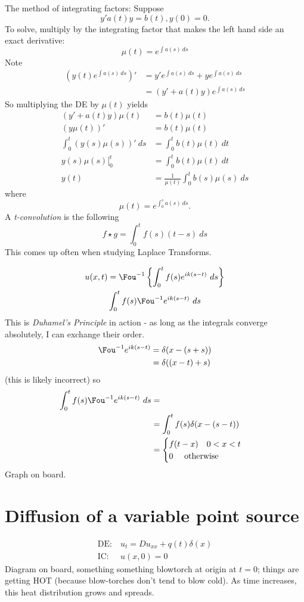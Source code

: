 \documentclass[cm]{article}
\begin{document}
\xex
\rec
The method of integrating factors: Suppose
$$y' a(t)y = b(t), y(0) = 0.$$
To solve, multiply by the integrating factor that makes the left hand side an
exact derivative:
$$\mu(t) = e^{\int a(s)~ds}$$
Note
\begin{align*}
    (y(t) e^{\int a(s)~ds})' &= y' e^{\int a(s) ~ds} + y e^{\int a(s)~ds} \\
    &= (y' + a(t) y)e^{\int a(s)~ds}
\end{align*}
So multiplying the DE by $\mu(t)$ yields
\begin{align*}
(y'+a(t)y)\mu(t) &= b(t) \mu(t) \\
(y \mu(t))' &= b(t) \mu(t) \\
\int_0^t (y(s)\mu(s))'~ds &= \int_0^t b(t) \mu(t)~dt \\
y(s) \mu(s) \Big[_0^t &= \int_0^t b(t) \mu(t)~dt \\
y(t) &= \frac{1}{\mu(t)} \int_0^t b(s) \mu(s)~ds
\end{align*}
where
$$\mu(t) = e^{\int_0^s a(s)~ds}.$$
\xrec
{}
A \emph{t-convolution} is the following
$$f \star g = \int_0^t f(s) (t-s)~ds$$
This comes up often when studying Laplace Transforms.
\xdefn

\begin{align*}
u(x,t) &= \Fou^{-1} \left\{ \int_0^t f(s) e^{ik(s-t)}~ds\right\} \\
          & \int_0^t f(s) \Fou^{-1} e^{ik(s-t)}~ds
\end{align*}
This is \emph{Duhamel's Principle} in action - as long as the integrals converge
absolutely, I can exchange their order.
\begin{align*}
\Fou^{-1}e^{ik(s-t)} &= \delta(x - (s + s)) \\
    &= \delta((x-t)+s)
\end{align*}
(this is likely incorrect) so
\begin{align*}
\int_0^t f(s) \Fou^{-1} e^{ik(s-t)}~ds &= \\
    &= \int_0^t f(s) \delta(x - (s - t))\\
    &= \begin{cases}
    f(t-x) \quad 0 < x < t \\ 
    0 \quad \text{ otherwise}
    \end{cases}
\end{align*}
Graph on board.

\section{Diffusion of a variable point source}
\begin{align*}
\text{DE:}&~ u_t = Du_{xx} + q(t)\delta(x) \\
\text{IC:}&~ u(x,0) = 0
\end{align*}
Diagram on board, something something blowtorch at origin at $t=0$; things are
getting HOT (because blow-torches don't tend to blow cold). As time increases,
this heat distribution grows and spreads.
\end{document}
